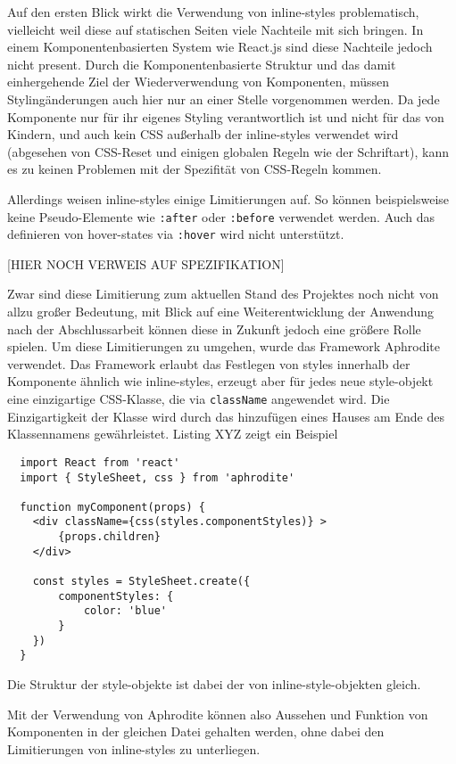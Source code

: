 Auf den ersten Blick wirkt die Verwendung von inline-styles problematisch, vielleicht weil diese auf statischen Seiten viele Nachteile mit sich bringen. In einem Komponentenbasierten System wie React.js sind diese Nachteile jedoch nicht present. Durch die Komponentenbasierte Struktur und das damit einhergehende Ziel der Wiederverwendung von Komponenten, müssen Stylingänderungen auch hier nur an einer Stelle vorgenommen werden. Da jede Komponente nur für ihr eigenes Styling verantwortlich ist und nicht für das von Kindern, und auch kein CSS außerhalb der inline-styles verwendet wird (abgesehen von CSS-Reset und einigen globalen Regeln wie der Schriftart), kann es zu keinen Problemen mit der Spezifität von CSS-Regeln kommen.

Allerdings weisen inline-styles einige Limitierungen auf. So können beispielsweise keine Pseudo-Elemente wie \verb|:after| oder \verb|:before| verwendet werden. Auch das definieren von hover-states via \verb|:hover| wird nicht unterstützt.

[HIER NOCH VERWEIS AUF SPEZIFIKATION]

Zwar sind diese Limitierung zum aktuellen Stand des Projektes noch nicht von allzu großer Bedeutung, mit Blick auf eine Weiterentwicklung der Anwendung nach der Abschlussarbeit können diese in Zukunft jedoch eine größere Rolle spielen.
Um diese  Limitierungen zu umgehen, wurde das Framework Aphrodite verwendet. Das Framework erlaubt das Festlegen von styles innerhalb der Komponente ähnlich wie inline-styles, erzeugt aber für jedes neue style-objekt eine einzigartige CSS-Klasse, die via \verb|className| angewendet wird. Die Einzigartigkeit der Klasse wird durch das hinzufügen eines Hauses am Ende des Klassennamens gewährleistet.  Listing XYZ zeigt ein Beispiel

\begin{lstlisting}
  import React from 'react'
  import { StyleSheet, css } from 'aphrodite'

  function myComponent(props) {
  	<div className={css(styles.componentStyles)} >
  		{props.children}
  	</div>

  	const styles = StyleSheet.create({
  		componentStyles: {
  			color: 'blue'
  		}
  	})
  }
\end{lstlisting}

Die Struktur der style-objekte ist dabei der von inline-style-objekten gleich.

Mit der Verwendung von Aphrodite können also Aussehen und Funktion von Komponenten in der gleichen Datei gehalten werden, ohne dabei den Limitierungen von inline-styles zu unterliegen.

